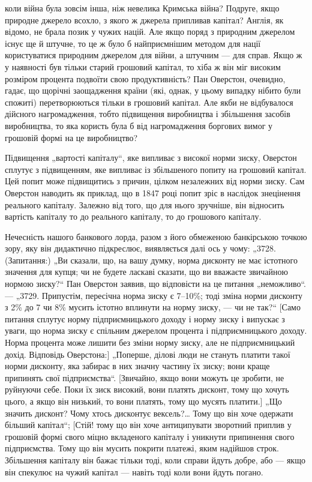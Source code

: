 \parcont{}  %
коли війна була зовсім інша, ніж невелика Кримська війна? Подруге, якщо природне джерело всохло, з
якого ж джерела припливав капітал? Англія, як відомо, не брала позик у чужих націй.
Але якщо поряд з природним джерелом існує ще й штучне, то
це ж було б найприємнішим методом для нації користуватися
природним джерелом для війни, а штучним — для справ. Якщо ж
у наявності був тільки старий грошовий капітал, то хіба ж
він міг високим розміром процента подвоїти свою продуктивність?
Пан Оверстон, очевидно, гадає, що щорічні заощадження країни
(які, однак, у цьому випадку нібито були спожиті) перетворюються тільки в грошовий капітал. Але якби
не відбувалося
дійсного нагромадження, тобто підвищення виробництва і збільшення засобів виробництва, то яка
користь була б від нагромадження боргових вимог у грошовій формі на це виробництво?

Підвищення „вартості капіталу“, яке випливає з високої
норми зиску, Оверстон сплутує з підвищенням, яке випливає
із збільшеного попиту на грошовий капітал. Цей попит може
підвищитись з причин, цілком незалежних від норми зиску. Сам
Оверстон наводить як приклад, що в 1847 році попит зріс в наслідок знецінення реального капіталу.
Залежно від того, що для
нього зручніше, він відносить вартість капіталу то до реального
капіталу, то до грошового капіталу.

Нечесність нашого банкового лорда, разом з його обмеженою
банкірською точкою зору, яку він дидактично підкреслює, виявляється далі ось у чому: „3728.
(Запитання:) „Ви сказали, що,
на вашу думку, норма дисконту не має істотного значення для
купця; чи не будете ласкаві сказати, що ви вважаєте звичайною нормою зиску?“ Пан Оверстон заявив, що
відповісти на це
питання „неможливо“. — „3729. Припустім, пересічна норма
зиску є 7--10\%; тоді зміна норми дисконту з 2\% до 7 чи 8\%
мусить істотно вплинути на норму зиску, — чи не так?“ [Само
питання сплутує норму підприємницького доходу і норму зиску
і випускає з уваги, що норма зиску є спільним джерелом процента
і підприємницького доходу. Норма процента може лишити без
зміни норму зиску, але не підприємницький дохід. Відповідь Оверстона:] „Поперше, ділові люди не
стануть платити такої норми
дисконту, яка забирає в них значну частину їх зиску; вони краще
припинять свої підприємства“. [Звичайно, якщо вони можуть це
зробити, не руйнуючи себе. Поки їх зиск високий, вони платять
дисконт, тому що хочуть цього, а якщо він низький, то вони платять,
тому що мусять платити.] „Що значить дисконт? Чому хтось
дисконтує вексель?\dots{} Тому що він хоче одержати більший капітал“; [Стій! тому що він хоче
антиципувати зворотний приплив у грошовій формі свого міцно вкладеного капіталу і
уникнути припинення свого підприємства. Тому що він мусить
покрити платежі, яким надійшов строк. Збільшення капіталу він
бажає тільки тоді, коли справи йдуть добре, або — якщо він спекулює на чужий капітал — навіть тоді
коли вони йдуть погано.
\parbreak{}  %
